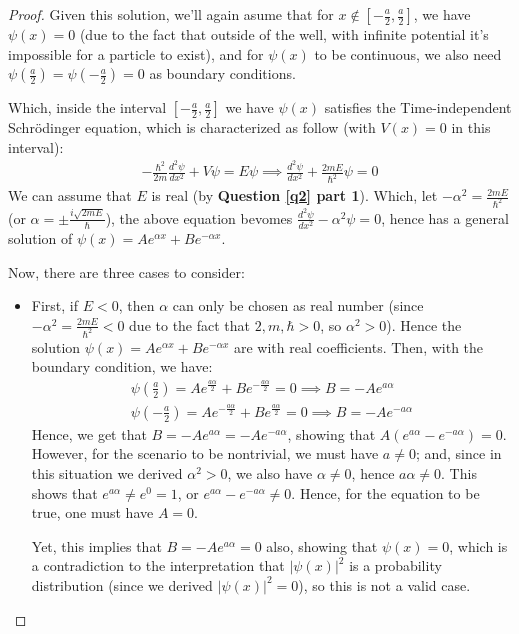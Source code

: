 \documentclass{article}
\begin{document}
\begin{proof}
    Given this solution, we'll again asume that for $x\notin [-\frac{a}{2},\frac{a}{2}]$, we have $\psi(x)=0$ (due to the fact that outside of the well, with infinite potential it's impossible for a particle to exist), and for $\psi(x)$ to be continuous, we also need $\psi(\frac{a}{2})=\psi(-\frac{a}{2})=0$ as boundary conditions.

    \hfil

    Which, inside the interval $[-\frac{a}{2},\frac{a}{2}]$ we have $\psi(x)$ satisfies the Time-independent Schrödinger equation, which is characterized as follow (with $V(x)=0$ in this interval):
    \begin{align}
        -\frac{\hbar^2}{2m}\frac{d^2\psi}{dx^2}+V\psi=E\psi\implies \frac{d^2\psi}{dx^2}+\frac{2mE}{\hbar^2}\psi=0
    \end{align} 
    We can assume that $E$ is real (by \textbf{Question \ref{q2} part 1}). Which, let $-\alpha^2=\frac{2mE}{\hbar^2}$ (or $\alpha=\pm\frac{i\sqrt{2mE}}{\hbar}$), the above equation bevomes $\frac{d^2\psi}{dx^2}-\alpha^2\psi=0$, hence has a general solution of $\psi(x)=Ae^{\alpha x}+Be^{-\alpha x}$.

    \hfil

    Now, there are three cases to consider:
    \begin{itemize}
        \item First, if $E<0$, then $\alpha$ can only be chosen as real number (since $-\alpha^2=\frac{2mE}{\hbar^2}<0$ due to the fact that $2,m,\hbar>0$, so $\alpha^2>0$). Hence the solution $\psi(x)=Ae^{\alpha x}+Be^{-\alpha x}$ are with real coefficients. Then, with the boundary condition, we have:
        \begin{align}
            \psi\left(\frac{a}{2}\right)=Ae^{\frac{a\alpha}{2}}+Be^{-\frac{a\alpha}{2}}=0\implies B=-Ae^{a\alpha}\\
            \psi\left(-\frac{a}{2}\right)=Ae^{-\frac{a\alpha}{2}}+Be^{\frac{a\alpha}{2}}=0\implies B=-Ae^{-a\alpha}
        \end{align}
        Hence, we get that $B=-Ae^{a\alpha}=-Ae^{-a\alpha}$, showing that $A(e^{a\alpha}-e^{-a\alpha})=0$. However, for the scenario to be nontrivial, we must have $a\neq 0$; and, since in this situation we derived $\alpha^2>0$, we also have $\alpha\neq 0$, hence $a\alpha\neq 0$. This shows that $e^{a\alpha}\neq e^0=1$, or $e^{a\alpha}-e^{-a\alpha}\neq 0$. Hence, for the equation to be true, one must have $A=0$. 

        Yet, this implies that $B=-Ae^{a\alpha}=0$ also, showing that $\psi(x)=0$, which is a contradiction to the interpretation that $|\psi(x)|^2$ is a probability distribution (since we derived $|\psi(x)|^2=0$), so this is not a valid case.


\end{itemize}
\end{proof}
\end{document}
